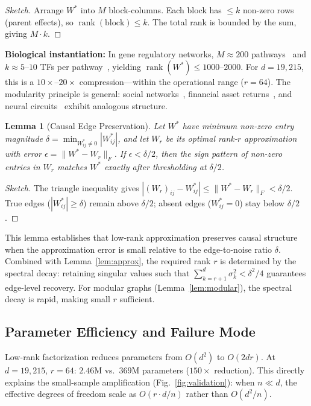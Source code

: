 \documentclass{article}
\DeclareMathOperator{\rank}{rank}
\newtheorem{lemma}{Lemma}
\theoremstyle{definition}
\begin{document}
\begin{proof}[Sketch]
Arrange $W^*$ into $M$ block-columns. Each block has $\le k$ non-zero rows (parent effects), so $\rank(\text{block}) \le k$. The total rank is bounded by the sum, giving $M \cdot k$.
\end{proof}

\textbf{Biological instantiation:} In gene regulatory networks, $M \approx 200$ pathways~\citep{kanehisa2000kegg} and $k \approx 5$--$10$ TFs per pathway~\citep{vaquerizas2009census,lambert2018human}, yielding $\rank(W^*) \le 1000$--$2000$. For $d = 19{,}215$, this is a $10\times$--$20\times$ compression---within the operational range ($r = 64$). The modularity principle is general: social networks~\citep{girvan2002community}, financial asset returns~\citep{mantegna1999hierarchical}, and neural circuits~\citep{sporns2004organization} exhibit analogous structure.

\begin{lemma}[Causal Edge Preservation]\label{lem:edge}
Let $W^*$ have minimum non-zero entry magnitude $\delta = \min_{W^*_{ij} \neq 0} |W^*_{ij}|$, and let $W_r$ be its optimal rank-$r$ approximation with error $\epsilon = \|W^* - W_r\|_F$. If $\epsilon < \delta / 2$, then the sign pattern of non-zero entries in $W_r$ matches $W^*$ exactly after thresholding at $\delta / 2$.
\end{lemma}

\begin{proof}[Sketch]
The triangle inequality gives $|(W_r)_{ij} - W^*_{ij}| \le \|W^* - W_r\|_F < \delta/2$. True edges ($|W^*_{ij}| \ge \delta$) remain above $\delta/2$; absent edges ($W^*_{ij}=0$) stay below $\delta/2$.
\end{proof}

This lemma establishes that low-rank approximation preserves causal structure when the approximation error is small relative to the edge-to-noise ratio $\delta$. Combined with Lemma~\ref{lem:approx}, the required rank $r$ is determined by the spectral decay: retaining singular values such that $\sum_{k=r+1}^d \sigma_k^2 < \delta^2 / 4$ guarantees edge-level recovery. For modular graphs (Lemma~\ref{lem:modular}), the spectral decay is rapid, making small $r$ sufficient.

\subsection{Parameter Efficiency and Failure Mode}

Low-rank factorization reduces parameters from $O(d^2)$ to $O(2dr)$. At $d = 19{,}215$, $r = 64$: $2.46$M vs.\ $369$M parameters ($150\times$ reduction). This directly explains the small-sample amplification (Fig.~\ref{fig:validation}): when $n \ll d$, the effective degrees of freedom scale as $O(r \cdot d / n)$ rather than $O(d^2 / n)$.
\end{document}
